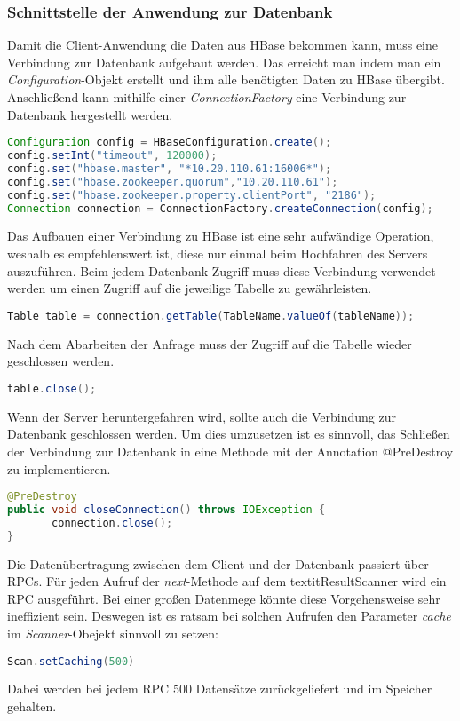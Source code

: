 \subsubsection{Schnittstelle der Anwendung zur Datenbank}\label{schnittstelle}

Damit die Client-Anwendung die Daten aus HBase bekommen kann, muss eine Verbindung zur Datenbank aufgebaut werden.
Das erreicht man indem man ein \textit{Configuration}-Objekt erstellt und ihm alle benötigten Daten zu HBase übergibt. Anschließend kann  mithilfe einer \textit{ConnectionFactory} eine Verbindung zur Datenbank hergestellt werden.

\begin{lstlisting}[language=Java]
Configuration config = HBaseConfiguration.create();
config.setInt("timeout", 120000);
config.set("hbase.master", "*10.20.110.61:16006*");
config.set("hbase.zookeeper.quorum","10.20.110.61");
config.set("hbase.zookeeper.property.clientPort", "2186");
Connection connection = ConnectionFactory.createConnection(config);
\end{lstlisting}

Das Aufbauen einer Verbindung zu HBase ist eine sehr aufwändige Operation, weshalb es empfehlenswert ist, diese nur einmal beim Hochfahren des Servers auszuführen.
Beim jedem Datenbank-Zugriff muss diese Verbindung verwendet werden um einen Zugriff auf die jeweilige Tabelle zu gewährleisten.

\begin{lstlisting}[language=Java]
Table table = connection.getTable(TableName.valueOf(tableName));
\end{lstlisting}

Nach dem Abarbeiten der Anfrage muss der Zugriff auf die Tabelle wieder geschlossen werden.
\begin{lstlisting}[language=Java]
table.close();
\end{lstlisting}

Wenn der Server heruntergefahren wird,  sollte auch die Verbindung zur Datenbank geschlossen werden.
Um dies umzusetzen ist es sinnvoll, das Schließen der Verbindung zur Datenbank in eine Methode mit der Annotation @PreDestroy zu implementieren.

\begin{lstlisting}[language=Java]
@PreDestroy
public void closeConnection() throws IOException {
       connection.close();
}
\end{lstlisting}

Die Datenübertragung zwischen dem Client und der Datenbank passiert über \acp{RPC}. Für jeden Aufruf der \textit{next}-Methode auf dem textit{ResultScanner} wird ein \ac{RPC}  ausgeführt. Bei einer großen Datenmege könnte diese Vorgehensweise sehr ineffizient sein. Deswegen ist es ratsam bei solchen Aufrufen den Parameter \textit{cache} im \textit{Scanner}-Obejekt sinnvoll zu setzen:
\begin{lstlisting}[language=Java]
Scan.setCaching(500)
\end{lstlisting}
Dabei werden bei jedem \ac{RPC} 500 Datensätze zurückgeliefert und im Speicher gehalten.


